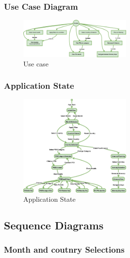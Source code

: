 \documentclass[]{project_final}
\begin{document}
\subsubsection{Use Case Diagram}

\begin{figure}[ht!]
    \centering
    \includegraphics[width=0.5\textwidth]{TPUseCase.png}
    \vspace*{0.0cm}
    \caption{Use case}
    \label{fig:1}
\end{figure}
\newpage
\subsubsection{Application State}

\begin{figure}[ht!]
    \centering
    \includegraphics[width=0.5\textwidth]{TPApplicationState.png}
    \vspace*{0.0cm}
    \caption{Application State}
    \label{fig:1}
\end{figure}
\newpage
\subsection{Sequence Diagrams}
\subsubsection{Month and coutnry Selections}
\end{document}
